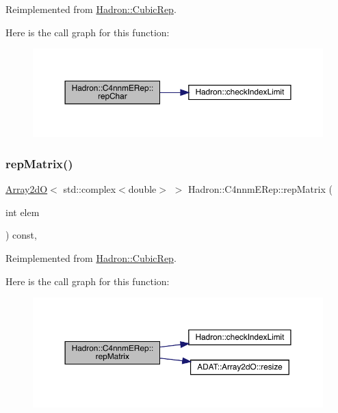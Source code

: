 Reimplemented from \mbox{\hyperlink{structHadron_1_1CubicRep_af45227106e8e715e84b0af69cd3b36f8}{Hadron\+::\+Cubic\+Rep}}.

Here is the call graph for this function\+:
\nopagebreak
\begin{figure}[H]
\begin{center}
\leavevmode
\includegraphics[width=350pt]{dc/d30/structHadron_1_1C4nnmERep_af3cb7f743630f5a14e38a10ee61dc9ff_cgraph}
\end{center}
\end{figure}
\mbox{\label{structHadron_1_1C4nnmERep_adb5804895fb825dd5a5fde9c417e5cb8}} 
\subsubsection{\texorpdfstring{repMatrix()}{repMatrix()}\hspace{0.1cm}{\footnotesize\ttfamily [1/2]}}
{\footnotesize\ttfamily \mbox{\hyperlink{classADAT_1_1Array2dO}{Array2dO}}$<$ std\+::complex$<$double$>$ $>$ Hadron\+::\+C4nnm\+E\+Rep\+::rep\+Matrix (\begin{DoxyParamCaption}\item[{int}]{elem }\end{DoxyParamCaption}) const\hspace{0.3cm}{\ttfamily [inline]}, {\ttfamily [virtual]}}



Reimplemented from \mbox{\hyperlink{structHadron_1_1CubicRep_ac5d7e9e6f4ab1158b5fce3e4ad9e8005}{Hadron\+::\+Cubic\+Rep}}.

Here is the call graph for this function\+:
\nopagebreak
\begin{figure}[H]
\begin{center}
\leavevmode
\includegraphics[width=350pt]{dc/d30/structHadron_1_1C4nnmERep_adb5804895fb825dd5a5fde9c417e5cb8_cgraph}
\end{center}
\end{figure}
\mbox{\label{structHadron_1_1C4nnmERep_adb5804895fb825dd5a5fde9c417e5cb8}} 
